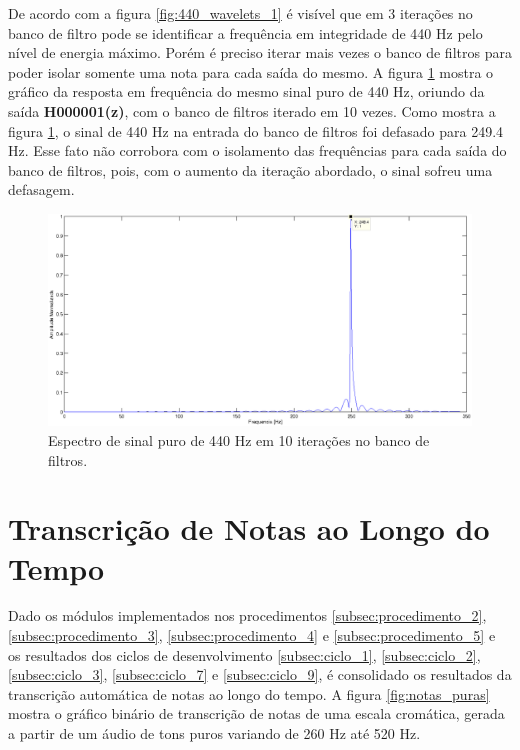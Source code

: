 De acordo com a figura \ref{fig:440_wavelets_1} é visível que em 3 iterações no banco de filtro pode se identificar a frequência em integridade de 440 Hz pelo nível de energia máximo. Porém é preciso iterar mais vezes o banco de filtros para poder isolar somente uma nota para cada saída do mesmo. A figura \ref{fig:440_wavelets_2} mostra o gráfico da resposta em frequência do mesmo sinal puro de 440 Hz, oriundo da saída \textbf{H000001(z)}, com o banco de filtros iterado em 10 vezes. Como mostra a figura \ref{fig:440_wavelets_2}, o sinal de 440 Hz na entrada do banco de filtros foi defasado para 249.4 Hz. Esse fato não corrobora com o isolamento das frequências para cada saída do banco de filtros, pois, com o aumento da iteração abordado, o sinal sofreu uma defasagem.


\begin{figure}[h]
    \centering
    \includegraphics[keepaspectratio=true,scale=0.45]{figuras/wavelet_deslocado.eps}
  \caption{Espectro de sinal puro de 440 Hz em 10 iterações no banco de filtros.}
  \label{fig:440_wavelets_2}
\end{figure}

\section{Transcrição de Notas ao Longo do Tempo}
Dado os módulos implementados nos procedimentos \ref{subsec:procedimento_2}, \ref{subsec:procedimento_3}, \ref{subsec:procedimento_4} e \ref{subsec:procedimento_5} e os resultados dos ciclos de desenvolvimento \ref{subsec:ciclo_1}, \ref{subsec:ciclo_2}, \ref{subsec:ciclo_3}, \ref{subsec:ciclo_7} e \ref{subsec:ciclo_9}, é consolidado os resultados da transcrição automática de notas ao longo do tempo. A figura \ref{fig:notas_puras} mostra o gráfico binário de transcrição de notas de uma escala cromática, gerada a partir de um áudio de tons puros variando de 260 Hz até 520 Hz.


